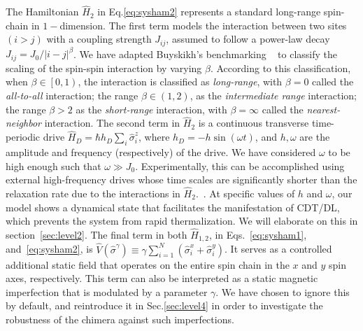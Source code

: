\documentclass[12pt]{iopart}
\begin{document}
The Hamiltonian $\hat{H}_2$ in Eq.\eqref{eq:sysham2} represents a standard long-range spin-chain in $1-$dimension. The first term models the interaction between two sites $(i>j)$ with a coupling strength $J_{ij}$, assumed to follow a power-law decay $J_{ij}={J_0}/{|i-j|^\beta}$. We have adapted Buyskikh's benchmarking ~\cite{buyskikh_entanglement_2016} to classify the scaling of the spin-spin interaction by varying $\beta$. According to this classification, when $\beta\in\left[0,1\right)$, the interaction is classified as \textit{long-range}, with $\beta=0$ called the \textit{all-to-all} interaction; the range $\beta\in \left(1,2\right)$, as the \textit{ intermediate range} interaction; the range $\beta > 2$ as the \textit{ short-range} interaction, with $\beta= \infty$ called the \textit{ nearest-neighbor} interaction. The second term in $\hat{H}_2$ is a continuous transverse time-periodic drive $\displaystyle \hat{H}_D=\hbar h_D \sum_i\hat{\sigma}^z_i$, where $\displaystyle h_D = -h\sin{(\omega t)}$, and $h,\omega$ are the amplitude and frequency (respectively) of the drive. We have considered $\omega$ to be high enough such that $\omega\gg J_0$. 	Experimentally, this can be accomplished using external high-frequency drives whose time scales are significantly shorter than the relaxation rate due to the interactions in $\hat{H}_2$.~\cite{choi_observation_2017,zhang_observation_2017,Cirac_1995,Blatt_2012}. At specific values of $h$ and $\omega$, our model shows a dynamical state that facilitates the manifestation of CDT/DL, which prevents the system from rapid thermalization. We will elaborate on this in section~\ref{sec:level2}. The final term in both $\hat{H}_{1,2}$, in Eqs.~\eqref{eq:sysham1}, and~\eqref{eq:sysham2}, is $\displaystyle \hat{V}(\hat{\sigma}^{\gamma}) \equiv\gamma  \sum_{i=1}^{N} (\hat{\sigma}^x_i + \hat{\sigma}^y_i)$. It serves as a controlled additional static field that operates on the entire spin chain in the $x$ and $y$ spin axes, respectively.  This term can also be interpreted as a static magnetic imperfection that is modulated by a parameter $\gamma$. We have chosen to ignore this by default, and reintroduce it in Sec.\ref{sec:level4} in order to investigate the robustness of the chimera against such imperfections.
\end{document}
